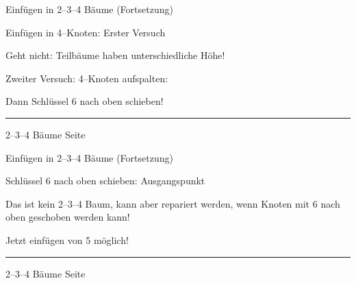 \begin{slide}{}
\normalsize

\begin{center}
Einf\"ugen in 2--3--4 B\"aume (Fortsetzung)
\end{center}
\vspace*{0.5cm}

\footnotesize
Einf\"ugen in 4--Knoten: Erster Versuch

 \raisebox{3.4cm}{ \ 5 einf\"ugen \ }  

Geht nicht: Teilb\"aume haben unterschiedliche H\"ohe!
\vspace*{0.5cm}

\begin{center}
\end{center}
\vspace*{0.5cm}

Zweiter Versuch: 4--Knoten aufspalten:

\hspace*{1.3cm}  \raisebox{2.4cm}{ \ aufspalten \ }  

Dann Schl\"ussel 6 nach oben schieben!

\vspace*{\fill}
\tiny \addtocounter{mypage}{1}
\rule{17cm}{1mm}
2--3--4 B\"aume  \hspace*{\fill} Seite 
\end{slide}


\begin{slide}{}
\normalsize

\begin{center}
Einf\"ugen in 2--3--4 B\"aume (Fortsetzung)
\end{center}
\vspace*{0.5cm}

\footnotesize
Schl\"ussel 6 nach oben schieben: Ausgangspunkt

\hspace*{2.3cm}  

Das ist kein 2--3--4 Baum, kann aber repariert werden, wenn
Knoten mit 6 nach oben geschoben werden kann!

\hspace*{2.3cm}  

Jetzt einf\"ugen von 5 m\"oglich!

\hspace*{2.3cm}  

\vspace*{\fill}
\tiny \addtocounter{mypage}{1}
\rule{17cm}{1mm}
2--3--4 B\"aume  \hspace*{\fill} Seite 
\end{slide}

